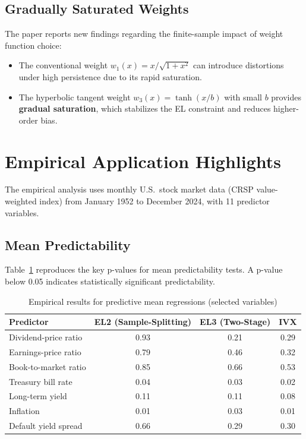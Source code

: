 \documentclass[11pt,a4paper]{article}
\theoremstyle{definition}
\theoremstyle{remark}
\begin{document}
\subsection{Gradually Saturated Weights}

The paper reports new findings regarding the finite-sample impact of weight function choice:
\begin{itemize}
    \item The conventional weight $w_1(x) = x/\sqrt{1+x^2}$ can introduce distortions
    under high persistence due to its rapid saturation.
    \item The hyperbolic tangent weight $w_3(x) = \tanh(x/b)$ with small $b$
    provides \textbf{gradual saturation}, which stabilizes the EL constraint
    and reduces higher-order bias.
\end{itemize}

\section{Empirical Application Highlights}

The empirical analysis uses monthly U.S.\ stock market data (CRSP value-weighted index)
from January 1952 to December 2024, with 11 predictor variables.

\subsection{Mean Predictability}

Table~\ref{tab:empirical_mean} reproduces the key p-values for mean predictability tests.
A p-value below 0.05 indicates statistically significant predictability.

\begin{table}[H]
\centering
\caption{Empirical results for predictive mean regressions (selected variables)}
\label{tab:empirical_mean}
\begin{tabular}{lccc}
\toprule
\textbf{Predictor} & \textbf{EL2 (Sample-Splitting)} & \textbf{EL3 (Two-Stage)} & \textbf{IVX} \\
\midrule
Dividend-price ratio  & 0.93 & 0.21 & 0.29 \\
Earnings-price ratio  & 0.79 & 0.46 & 0.32 \\
Book-to-market ratio  & 0.85 & 0.66 & 0.53 \\
Treasury bill rate    & 0.04 & 0.03 & 0.02 \\
Long-term yield       & 0.11 & 0.11 & 0.08 \\
Inflation             & 0.01 & 0.03 & 0.01 \\
Default yield spread  & 0.66 & 0.29 & 0.30 \\
\bottomrule
\end{tabular}
\end{table}
\end{document}
